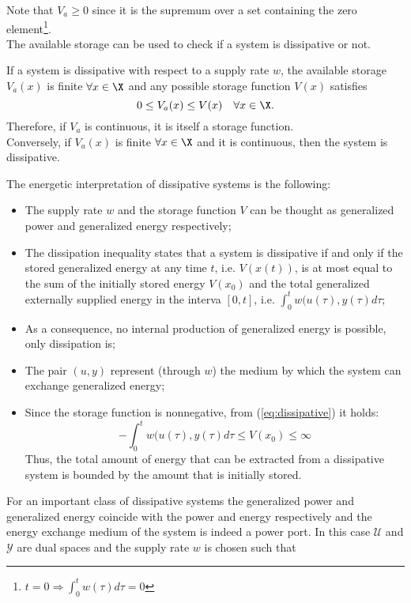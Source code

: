 %
Note that $V_a\geq 0$ since it is the supremum over a set containing the zero element\footnote{$t=0\Rightarrow\int_{0}^{t}w(\tau)d\tau=0$}.\\
The available storage can be used to check if a system is dissipative or not.
%
\begin{prop}[Willems]
	If a system is dissipative with respect to a supply rate $w$, the available storage $V_a(x)$ is finite $\forall x \in\X$ and any possible storage function $V(x)$ satisfies
	\begin{equation*}
	0\leq V_a(x)\leq V(x)\quad\forall x\in\X.
	\end{equation*}
	Therefore, if $V_a$ is continuous, it is itself a storage function.\\
	Conversely, if $V_a(x)$ is finite $\forall x\in\X$ and it is continuous, then the system is dissipative. 
\end{prop}
%
\begin{rem}
	The energetic interpretation of dissipative systems is the following:
	\begin{itemize}
		\item [1.]  The supply rate $w$ and the storage function $V$ can be thought as generalized power and generalized energy respectively;
		\item [2.] The dissipation inequality states that a system is dissipative if and only if the stored generalized energy at any time $t$, i.e. $V(x(t))$, is at most equal to the sum of the initially stored energy $V(x_0)$ and the total generalized externally supplied energy in the interva $[0,t]$, i.e. $\int_{0}^{t}w(u(\tau),y(\tau)d\tau$;
		\item [3.] As a consequence, no internal production of generalized energy is possible, only dissipation is;
		\item [4.] The pair $(u,y)$ represent (through $w$) the medium by which the system can exchange generalized energy;
		\item [5.] Since the storage function is nonnegative, from (\ref{eq:dissipative}) it holds:
		\begin{equation*}
		-\int_{0}^{t}w(u(\tau),y(\tau)d\tau\leq V(x_0)\leq\infty
		\end{equation*}
		Thus, the total amount of energy that can be extracted from a dissipative system is bounded by the amount that is initially stored.
	\end{itemize}
\end{rem}
% 
For an important class of dissipative systems the generalized power and generalized energy coincide with the power and energy respectively and the energy exchange medium of the system is indeed a power port. In this case $\mathcal{U}$ and $\mathcal{Y}$ are dual spaces and the supply rate $w$ is chosen such that
